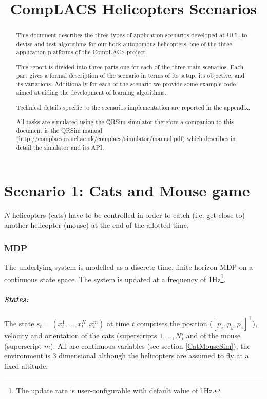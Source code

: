\documentclass[a4paper,11pt]{report}
\title{{CompLACS} Helicopters Scenarios}
\newcommand{\sname}{QRSim\xspace}
\newcommand{\webman}{\url{http://complacs.cs.ucl.ac.uk/complacs/simulator/manual.pdf}\xspace}
\begin{document}
\maketitle

\begin{abstract}
This document describes the three types of application scenarios developed at UCL to devise and test algorithms for our flock autonomous helicopters, one of the three application platforms of the {CompLACS} project.

This report is divided into three parts one for each of the three main scenarios.
Each part gives a formal description of the scenario in terms of its setup, its objective, and its variations. Additionally for each of the scenario we provide some example code aimed at aiding the development of learning algorithms.

Technical details specific to the scenarios implementation are reported in the appendix. 

All tasks are simulated using the \sname simulator therefore a companion to this document is the \sname manual (\webman) which describes in detail the simulator and its API.

\end{abstract}

\tableofcontents

\chapter{Scenario 1: Cats and Mouse game}
$N$ helicopters (cats) have to be controlled in order to catch (i.e. get close to) another helicopter (mouse) at the end of the allotted time.

\subsection{MDP}

The underlying system is modelled as a discrete time, finite horizon MDP on a continuous state space. The system is updated at a frequency of 1Hz\footnote{The update rate is user-configurable with default value of 1Hz.}. 

\paragraph{States:} The state $s_t = (x^1_t,...,x^{N}_t,x^m_t)$ at time $t$ comprises the position ($[p_x,p_y,p_z]^\intercal$), velocity and orientation of the cats (superscripts $1,...,N$) and of the mouse (superscript $m$). All are continuous variables (see section \ref{CatMouseSim}), the environment is 3 dimensional although the helicopters are assumed to fly at a fixed altitude.
\end{document}
